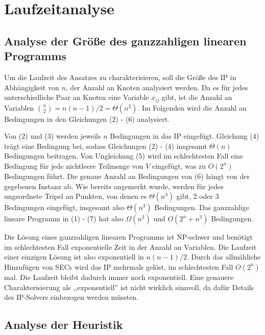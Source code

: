 \documentclass[a4paper, 10pt, ngerman]{article}
\begin{document}
\section{Laufzeitanalyse}

\subsection{Analyse der Größe des ganzzahligen linearen Programms}

Um die Laufzeit des Ansatzes zu charakterisieren, soll die Größe des IP in Abhängigkeit von $n$, der Anzahl an Knoten analysiert werden. Da es für jedes unterschiedliche Paar an Knoten eine Variable $x_{ij}$ gibt, ist die Anzahl an Variablen $\binom n 2 = n(n - 1) / 2 = \Theta(n^2)$. Im Folgenden wird die Anzahl an Bedingungen in den Gleichungen (2) - (6) analysiert.

Von (2) und (3) werden jeweils $n$ Bedingungen in das IP eingefügt. Gleichung (4) trägt eine Bedingung bei, sodass Gleichungen (2) - (4) insgesamt $\Theta(n)$ Bedingungen beitragen. Von Ungleichung (5) wird im schlechtesten Fall eine Bedingung für jede nichtleere Teilmenge von $V$ eingefügt, was zu $O(2^n)$ Bedingungen führt. Die genaue Anzahl an Bedingungen von (6) hängt von der gegebenen Instanz ab. Wie bereits angemerkt wurde, werden für jedes ungeordnete Tripel an Punkten, von denen es $\Theta(n^3)$ gibt, 2 oder 3 Bedingungen eingefügt, insgesamt also $\Theta(n^3)$ Bedingungen. Das ganzzahlige lineare Programm in (1) - (7) hat also $\Omega(n^3)$ und $O(2^n + n^3)$ Bedingungen.

Die Lösung eines ganzzahligen linearen Programms ist NP-schwer und benötigt im schlechtesten Fall exponentielle Zeit in der Anzahl an Variablen. Die Laufzeit einer einzigen Lösung ist also exponentiell in $n(n-1)/2$. Durch das allmähliche Hinzufügen von SECs wird das IP mehrmals gelöst, im schlechtesten Fall $O(2^n)$ mal. Die Laufzeit bleibt dadurch immer noch exponentiell. Eine genauere Charakterisierung als ,,exponentiell'' ist nicht wirklich sinnvoll, da dafür Details des IP-Solvers einbezogen werden müssten.

\subsection{Analyse der Heuristik}
\end{document}
